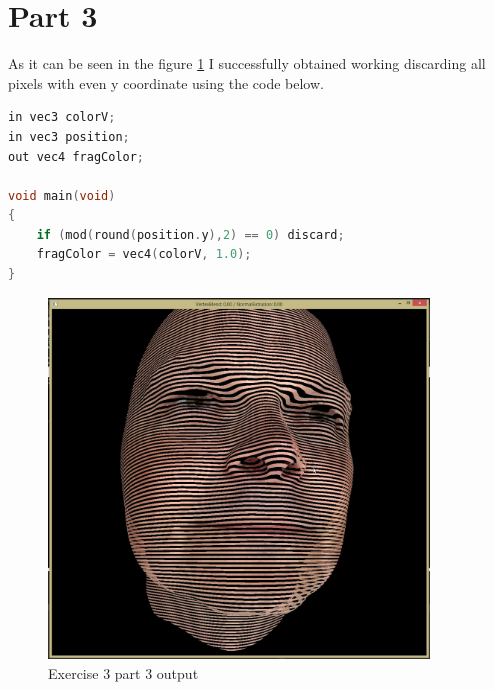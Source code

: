 \section{Part 3}
As it can be seen in the figure \ref{fig:exercise_3_part_3} I successfully obtained working 
discarding all pixels with even y coordinate using the code below.

\begin{lstlisting}[language=cpp, caption={Discarding pixels}]
in vec3 colorV;
in vec3 position;
out vec4 fragColor;

void main(void)
{
	if (mod(round(position.y),2) == 0) discard;
    fragColor = vec4(colorV, 1.0);
}
\end{lstlisting}

\begin{figure}[ht!]
	\begin{center}
		\includegraphics[width=0.9\textwidth]{figures/exercise_3_part_3}
	\end{center}
	\vspace{-4.5ex}\caption{Exercise 3 part 3 output}
	\label{fig:exercise_3_part_3} 
\end{figure}

